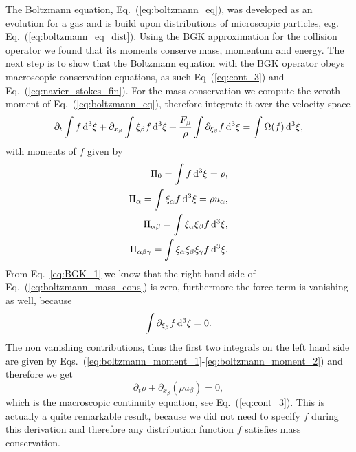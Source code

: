 The Boltzmann equation, Eq.~(\ref{eq:boltzmann_eq}), was developed as an evolution for a gas and is build upon distributions of microscopic particles, e.g. Eq.~(\ref{eq:boltzmann_eq_dist}).
Using the BGK approximation for the collision operator we found that its moments conserve mass, momentum and energy.
The next step is to show that the Boltzmann equation with the BGK operator obeys macroscopic conservation equations, as such Eq~(\ref{eq:cont_3}) and Eq.~(\ref{eq:navier_stokes_fin}).
For the mass conservation we compute the zeroth moment of Eq.~(\ref{eq:boltzmann_eq}), therefore integrate it over the velocity space
\begin{equation}\label{eq:boltzmann_mass_cons}
    \partial_t\int f\mathop{}\!\mathrm{d}^3\xi + \partial_{x_{\beta}}\int\xi_{\beta} f\mathop{}\!\mathrm{d}^3\xi + \frac{F_{\beta}}{\rho}\int\partial_{\xi_{\beta}}f\mathop{}\!\mathrm{d}^3\xi = \int\Omega(f)\mathop{}\!\mathrm{d}^3\xi,
\end{equation}
with moments of $f$ given by
\begin{align}
    \Pi_0 = \int f\mathop{}\!\mathrm{d}^3\xi = \rho, \label{eq:boltzmann_moment_1}\\
    \Pi_{\alpha} = \int\xi_{\alpha} f\mathop{}\!\mathrm{d}^3\xi = \rho u_{\alpha}, \label{eq:boltzmann_moment_2}\\
    \Pi_{\alpha\beta} = \int\xi_{\alpha}\xi_{\beta} f\mathop{}\!\mathrm{d}^3\xi, \label{eq:boltzmann_moment_3}\\
    \Pi_{\alpha\beta\gamma} = \int\xi_{\alpha}\xi_{\beta}\xi_{\gamma} f\mathop{}\!\mathrm{d}^3\xi. \label{eq:boltzmann_moment_4}
\end{align}
From Eq.~\ref{eq:BGK_1} we know that the right hand side of Eq.~(\ref{eq:boltzmann_mass_cons}) is zero, furthermore the force term is vanishing as well, because~\cite{krugerLatticeBoltzmannMethod2017} 
\begin{equation}
    \int\partial_{\xi_{\beta}}f\mathop{}\!\mathrm{d}^3\xi = 0.
\end{equation}
The non vanishing contributions, thus the first two integrals on the left hand side are given by Eqs.~(\ref{eq:boltzmann_moment_1}-\ref{eq:boltzmann_moment_2}) and therefore we get
\begin{equation}\label{eq:mass_boltzmann}
    \partial_t \rho + \partial_{x_{\beta}}(\rho u_{\beta}) = 0, 
\end{equation}
which is the macroscopic continuity equation, see Eq.~(\ref{eq:cont_3}).
This is actually a quite remarkable result, because we did not need to specify $f$ during this derivation and therefore any distribution function $f$ satisfies mass conservation.

